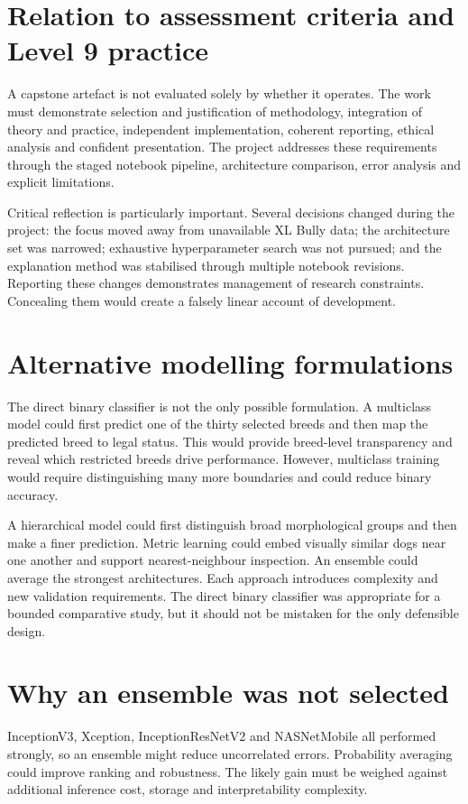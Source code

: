 \section{Relation to assessment criteria and Level 9 practice}
A capstone artefact is not evaluated solely by whether it operates. The work must demonstrate selection and justification of methodology, integration of theory and practice, independent implementation, coherent reporting, ethical analysis and confident presentation. The project addresses these requirements through the staged notebook pipeline, architecture comparison, error analysis and explicit limitations.

Critical reflection is particularly important. Several decisions changed during the project: the focus moved away from unavailable XL Bully data; the architecture set was narrowed; exhaustive hyperparameter search was not pursued; and the explanation method was stabilised through multiple notebook revisions. Reporting these changes demonstrates management of research constraints. Concealing them would create a falsely linear account of development.

\section{Alternative modelling formulations}
The direct binary classifier is not the only possible formulation. A multiclass model could first predict one of the thirty selected breeds and then map the predicted breed to legal status. This would provide breed-level transparency and reveal which restricted breeds drive performance. However, multiclass training would require distinguishing many more boundaries and could reduce binary accuracy.

A hierarchical model could first distinguish broad morphological groups and then make a finer prediction. Metric learning could embed visually similar dogs near one another and support nearest-neighbour inspection. An ensemble could average the strongest architectures. Each approach introduces complexity and new validation requirements. The direct binary classifier was appropriate for a bounded comparative study, but it should not be mistaken for the only defensible design.

\section{Why an ensemble was not selected}
InceptionV3, Xception, InceptionResNetV2 and NASNetMobile all performed strongly, so an ensemble might reduce uncorrelated errors. Probability averaging could improve ranking and robustness. The likely gain must be weighed against additional inference cost, storage and interpretability complexity.


